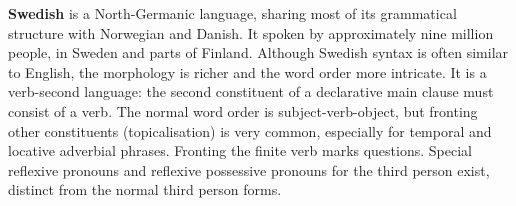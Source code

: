 \documentclass[runningheads,a4paper]{llncs}
\begin{document}
\textbf{Swedish} 
 is a North-Germanic language, sharing most of its grammatical structure 
with Norwegian and Danish. It spoken by approximately nine million
people, in Sweden and parts of Finland. 
Although Swedish syntax is often similar to English, the  morphology is richer and the
word order more intricate.
It is a verb-second language: %
the second constituent of a declarative main clause must consist of a verb.
The normal word order is subject-verb-object, but fronting other constituents
(topicalisation) is very common,  especially for temporal and
locative adverbial phrases. %
Fronting the finite verb marks questions.
Special reflexive pronouns and reflexive possessive pronouns for the third
person exist, %
distinct from the normal third person forms.\\
\end{document}
